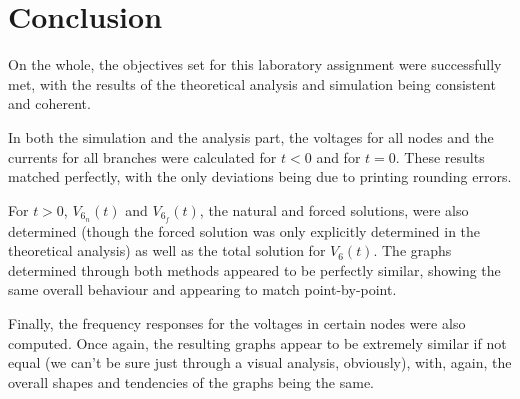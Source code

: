 
\section{Conclusion}
\label{sec:conclusion}

On the whole, the objectives set for this laboratory assignment were successfully met, with the results of the theoretical analysis and simulation being consistent and coherent.


In both the simulation and the analysis part, the voltages for all nodes and the currents for all branches were calculated for $t<0$ and for $t=0$. These results matched perfectly, with the only deviations being due to printing rounding errors.


For $t>0$, $V_{6_n}(t)$ and $V_{6_f}(t)$, the natural and forced solutions, were also determined (though the forced solution was only explicitly determined in the theoretical analysis) as well as the total solution for $V_6(t)$. The graphs determined through both methods appeared to be perfectly similar, showing the same overall behaviour and appearing to match point-by-point.


Finally, the frequency responses for the voltages in certain nodes were also computed. Once again, the resulting graphs appear to be extremely similar if not equal (we can't be sure just through a visual analysis, obviously), with, again, the overall shapes and tendencies of the graphs being the same.



